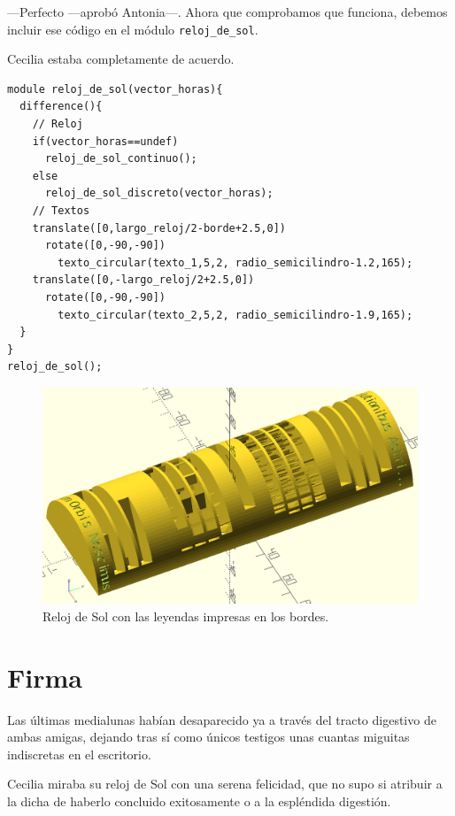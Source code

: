 ---Perfecto ---aprobó Antonia---. Ahora que comprobamos que funciona,
debemos incluir ese código en el módulo \lstinline!reloj_de_sol!.

Cecilia estaba completamente de acuerdo.

\begin{lstlisting}
module reloj_de_sol(vector_horas){
  difference(){
    // Reloj
    if(vector_horas==undef)
      reloj_de_sol_continuo();
    else
      reloj_de_sol_discreto(vector_horas);
    // Textos
    translate([0,largo_reloj/2-borde+2.5,0])
      rotate([0,-90,-90])
        texto_circular(texto_1,5,2, radio_semicilindro-1.2,165);
    translate([0,-largo_reloj/2+2.5,0])
      rotate([0,-90,-90])
        texto_circular(texto_2,5,2, radio_semicilindro-1.9,165);
  }
}
reloj_de_sol();
\end{lstlisting}%


\begin{figure}[ht]
  \centering
  \includegraphics[width=1\textwidth]{imagenes/reloj-con-leyendas-2}  
  \caption{Reloj de Sol con las leyendas impresas en los bordes.}
  \label{fig:reloj-con-leyendas-2}
\end{figure}


\section{Firma}

Las últimas medialunas habían desaparecido ya a través del tracto
digestivo de ambas amigas, dejando tras sí como únicos testigos unas
cuantas miguitas indiscretas en el escritorio.

Cecilia miraba su reloj de Sol con una serena felicidad, que no supo
si atribuir a la dicha de haberlo concluido exitosamente o a la
espléndida digestión.

